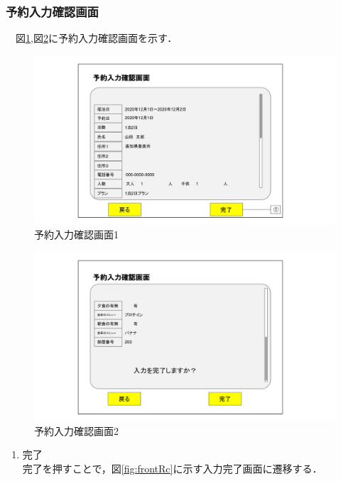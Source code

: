 \subsubsection{予約入力確認画面}
　図\ref{fig:frontRe1},図\ref{fig:frontRe2}に予約入力確認画面を示す．

\begin{figure}[H]
 \centering
   \includegraphics[width=150mm]{UI_front/reseC1.jpg}
 \caption{予約入力確認画面1}
 \label{fig:frontRe1}
\end{figure}

\begin{figure}[H]
 \centering
   \includegraphics[width=150mm]{UI_front/reseC2.jpg}
 \caption{予約入力確認画面2}
 \label{fig:frontRe2}
\end{figure}


\begin{enumerate}
\renewcommand{\labelenumi}{\textcircled{\scriptsize \theenumi}}
\item 完了\\ 完了を押すことで，図\ref{fig:frontRc}に示す入力完了画面に遷移する．
\end{enumerate}


